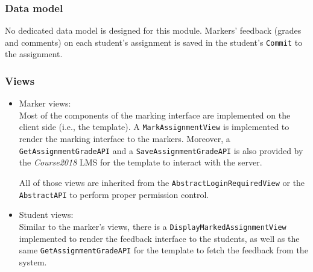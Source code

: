 \subsubsection{Data model}
No dedicated data model is designed for this module.
Markers' feedback
(grades and comments) on each student's assignment is saved in the student's
\texttt{Commit} to the assignment.

\subsubsection{Views}
    \begin{itemize}
        \item Marker views: \\
        Most of the components of the marking interface are implemented on
        the client side (i.e., the template). A \texttt{MarkAssignmentView}
        is implemented to render the marking interface to the markers.
        Moreover, a \texttt{GetAssignmentGradeAPI} and a
        \texttt{SaveAssignmentGradeAPI} is also provided by the
        \emph{Course2018} LMS for the template to interact with the server.

        All of those views are inherited from the 
        \texttt{AbstractLoginRequiredView}
        or the \texttt{AbstractAPI} to perform proper permission control.

        \item Student views: \\
        Similar to the marker's views, there is a
        \texttt{DisplayMarkedAssignmentView} implemented to render the feedback
        interface to the students, as well as the same 
        \texttt{GetAssignmentGradeAPI} for the template to fetch the feedback
        from the system.
    \end{itemize}


